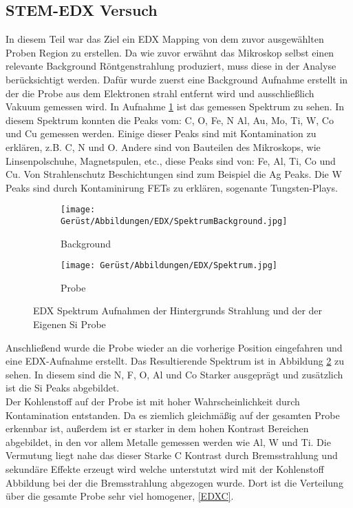 \subsection{STEM-EDX Versuch}
In diesem Teil war das Ziel ein EDX Mapping von dem zuvor ausgewählten Proben Region zu erstellen. Da wie zuvor erwähnt das Mikroskop selbst einen relevante Background Röntgenstrahlung produziert, muss diese in der Analyse berücksichtigt werden. Dafür wurde zuerst eine Background Aufnahme erstellt in der die Probe aus dem Elektronen strahl entfernt wird und ausschließlich Vakuum gemessen wird. In Aufnahme \cref{EDXSpecBG} ist das gemessen Spektrum zu sehen. In diesem Spektrum konnten die Peaks vom:  C, O, Fe, N Al, Au, Mo, Ti, W, Co und Cu gemessen werden. Einige dieser Peaks sind mit Kontamination zu erklären, z.B. C, N und O. Andere sind von Bauteilen des Mikroskops, wie Linsenpolschuhe, Magnetspulen, etc., diese Peaks sind von: Fe, Al, Ti, Co und Cu. Von Strahlenschutz Beschichtungen sind zum Beispiel die Ag Peaks. Die W Peaks sind durch Kontaminirung FETs zu erklären, sogenante Tungsten-Plays.

\begin{figure}[H]
     \centering
     \begin{subfigure}[b]{0.49\textwidth}
         \centering
         \texttt{[image: Gerüst/Abbildungen/EDX/SpektrumBackground.jpg]}
         \caption{Background}
         \label{EDXSpecBG}
     \end{subfigure}
     \hfill
     \begin{subfigure}[b]{0.49\textwidth}
         \centering
         \texttt{[image: Gerüst/Abbildungen/EDX/Spektrum.jpg]}
         \caption{Probe}
         \label{EDXSpecProb}
     \end{subfigure}
        \caption{EDX Spektrum Aufnahmen der Hintergrunds Strahlung und der der Eigenen Si Probe}
        \label{EDX}
\end{figure}

Anschließend wurde die Probe wieder an die vorherige Position eingefahren und eine EDX-Aufnahme erstellt. Das Resultierende Spektrum ist in Abbildung \cref{EDXSpecProb} zu sehen. In diesem sind die N, F, O, Al und Co Starker ausgeprägt und zusätzlich ist die Si Peaks abgebildet.\\
Der Kohlenstoff auf der Probe ist mit hoher Wahrscheinlichkeit durch Kontamination entstanden. Da es ziemlich gleichmäßig auf der gesamten Probe erkennbar ist, außerdem ist er starker in dem hohen Kontrast Bereichen abgebildet, in den vor allem Metalle gemessen werden wie Al, W und Ti. Die Vermutung liegt nahe das dieser Starke C Kontrast durch Bremsstrahlung und sekundäre Effekte erzeugt wird welche unterstutzt wird mit der Kohlenstoff Abbildung bei der die Bremsstrahlung abgezogen wurde. Dort ist die Verteilung über die gesamte Probe sehr viel homogener, \cref{EDXC}.

